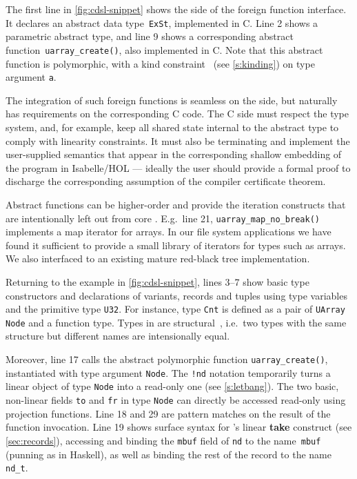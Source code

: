 \documentclass[9pt\ifFinal\else,preprint,nocopyrightspace\fi,\ifAlpha\else natbib,authoryear\fi]{sigplanconf}
\newcommand{\code}[1]{\texttt{#1}}
\begin{document}
\newcommand{\cdslfunc}[1]{\texttt{\textcolor{funccol}{#1}()}\xspace}
\newcommand{\cdslvar}[1]{\texttt{#1}\xspace}
\newcommand{\cdsltype}[1]{\texttt{\textcolor{typecol}{#1}}\xspace}
\newcommand{\cdsltypenospace}[1]{\texttt{\textcolor{typecol}{#1}}}

\noindent
The first line in \autoref{fig:cdsl-snippet} shows the \cdsl side of the
foreign function interface. It declares an abstract \CDSL data
type~\cdsltype{ExSt}, implemented in C. Line 2 shows a parametric abstract
type, and line 9 shows a corresponding abstract
function~\cdslfunc{uarray\_create}, also implemented in C. Note that this
abstract function is polymorphic, with a kind constraint~ (see
\autoref{s:kinding}) on type argument \cdslvar{a}.

The integration of such foreign functions is seamless on the \CDSL side, but
naturally has requirements on the corresponding C code. The C side must
respect the \CDSL type system, and, for example, keep all shared state
internal to the abstract type to comply with linearity constraints. It must
also be terminating and implement the user-supplied semantics that appear in
the corresponding shallow embedding of the \CDSL program in Isabelle/HOL ---
ideally the user should provide a formal proof to discharge the corresponding
assumption of the compiler certificate theorem.

Abstract functions can be higher-order and provide the
iteration constructs that are intentionally left out from core \cdsl.
E.g.\ line 21, \cdslfunc{uarray\_map\_no\_break} implements a map iterator
for arrays. In our
file system applications we have found it sufficient to provide a small
library of iterators for types such as arrays. We also interfaced to an
existing mature red-black tree implementation.

Returning to the example in \autoref{fig:cdsl-snippet}, lines 3--7 show basic
type constructors and declarations of variants, records and tuples
using type variables and the primitive type \cdsltype{U32}. For instance, type
\cdsltype{Cnt} is defined as a pair of \cdsltype{UArray Node} and a function
type. Types in \cdsl are structural~\citep{Pierce_02}, i.e.\ two types with
the same structure but different names are intensionally equal.

Moreover, line 17 calls the abstract polymorphic function   
\cdslfunc{uarray\_create}, instantiated with type argument \cdsltype{Node}.
The \code{!nd} notation temporarily turns a linear object of type
\cdsltype{Node} into a read-only one (see \autoref{s:letbang}). The two
basic, non-linear fields \code{to} and \code{fr} in type \cdsltype{Node} can
directly be accessed read-only using projection functions.
Line 18 and 29 are pattern matches on the result of the function invocation.
Line 19 shows surface syntax for \CDSL's linear \textbf{take} construct (see
\autoref{sec:records}), accessing and binding the \code{mbuf} field of
\code{nd} to the name~\code{mbuf} (punning as in Haskell), as well as
binding the rest of the record to the name \code{nd\_t}.
\end{document}
